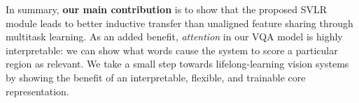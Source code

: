 In summary, \textbf{our main contribution} is to show that the proposed SVLR module leads to better inductive transfer than unaligned feature sharing through multitask learning. As an added benefit, \textit{attention} in our VQA model is highly interpretable: we can show what words cause the system to score a particular region as relevant. We take a small step towards lifelong-learning vision systems by showing the benefit of an interpretable, flexible, and trainable core representation.  



